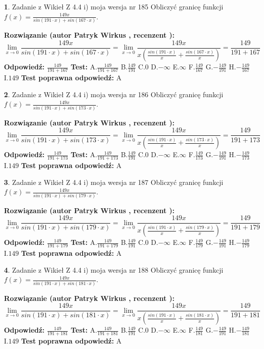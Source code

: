 \documentclass[12pt, a4paper]{article}
\theoremstyle{definition} %
\newtheorem{zad}{}
\newcommand{\zadStart}[1]{\begin{zad}#1\newline}
\newcommand{\zadStop}{\end{zad}}
\newcommand{\rozwStart}[2]{\noindent \textbf{Rozwiązanie (autor #1 , recenzent #2): }\newline}
\newcommand{\rozwStop}{\newline}
\newcommand{\odpStart}{\noindent \textbf{Odpowiedź:}\newline}
\newcommand{\odpStop}{\newline}
\newcommand{\testStart}{\noindent \textbf{Test:}\newline}
\newcommand{\testStop}{\newline}
\newcommand{\kluczStart}{\noindent \textbf{Test poprawna odpowiedź:}\newline}
\newcommand{\kluczStop}{\newline}
\begin{document}
\zadStart{Zadanie z Wikieł Z 4.4 i) moja wersja nr 185}
Obliczyć granicę funkcji $f(x)=\frac{149x}{sin(191\cdot x) +sin(167\cdot x)}$.
\zadStop
\rozwStart{Patryk Wirkus}{}
$$\lim\limits_{x\to 0}\frac{149x}{sin(191\cdot x) +sin(167\cdot x)}=\lim\limits_{x\to 0}\frac{149x}{x(\frac{sin(191\cdot x)}{x}+\frac{sin(167\cdot x)}{x})}=\frac{149}{191+167}$$
\rozwStop
\odpStart
$\frac{149}{191+167}$
\odpStop
\testStart
A.$\frac{149}{191+167}$
B.$\frac{149}{191}$
C.$0$
D.$-\infty$
E.$\infty$
F.$\frac{149}{167}$
G.$-\frac{149}{191}$
H.$-\frac{149}{167}$
I.$149$
\testStop
\kluczStart
A
\kluczStop



\zadStart{Zadanie z Wikieł Z 4.4 i) moja wersja nr 186}
Obliczyć granicę funkcji $f(x)=\frac{149x}{sin(191\cdot x) +sin(173\cdot x)}$.
\zadStop
\rozwStart{Patryk Wirkus}{}
$$\lim\limits_{x\to 0}\frac{149x}{sin(191\cdot x) +sin(173\cdot x)}=\lim\limits_{x\to 0}\frac{149x}{x(\frac{sin(191\cdot x)}{x}+\frac{sin(173\cdot x)}{x})}=\frac{149}{191+173}$$
\rozwStop
\odpStart
$\frac{149}{191+173}$
\odpStop
\testStart
A.$\frac{149}{191+173}$
B.$\frac{149}{191}$
C.$0$
D.$-\infty$
E.$\infty$
F.$\frac{149}{173}$
G.$-\frac{149}{191}$
H.$-\frac{149}{173}$
I.$149$
\testStop
\kluczStart
A
\kluczStop



\zadStart{Zadanie z Wikieł Z 4.4 i) moja wersja nr 187}
Obliczyć granicę funkcji $f(x)=\frac{149x}{sin(191\cdot x) +sin(179\cdot x)}$.
\zadStop
\rozwStart{Patryk Wirkus}{}
$$\lim\limits_{x\to 0}\frac{149x}{sin(191\cdot x) +sin(179\cdot x)}=\lim\limits_{x\to 0}\frac{149x}{x(\frac{sin(191\cdot x)}{x}+\frac{sin(179\cdot x)}{x})}=\frac{149}{191+179}$$
\rozwStop
\odpStart
$\frac{149}{191+179}$
\odpStop
\testStart
A.$\frac{149}{191+179}$
B.$\frac{149}{191}$
C.$0$
D.$-\infty$
E.$\infty$
F.$\frac{149}{179}$
G.$-\frac{149}{191}$
H.$-\frac{149}{179}$
I.$149$
\testStop
\kluczStart
A
\kluczStop



\zadStart{Zadanie z Wikieł Z 4.4 i) moja wersja nr 188}
Obliczyć granicę funkcji $f(x)=\frac{149x}{sin(191\cdot x) +sin(181\cdot x)}$.
\zadStop
\rozwStart{Patryk Wirkus}{}
$$\lim\limits_{x\to 0}\frac{149x}{sin(191\cdot x) +sin(181\cdot x)}=\lim\limits_{x\to 0}\frac{149x}{x(\frac{sin(191\cdot x)}{x}+\frac{sin(181\cdot x)}{x})}=\frac{149}{191+181}$$
\rozwStop
\odpStart
$\frac{149}{191+181}$
\odpStop
\testStart
A.$\frac{149}{191+181}$
B.$\frac{149}{191}$
C.$0$
D.$-\infty$
E.$\infty$
F.$\frac{149}{181}$
G.$-\frac{149}{191}$
H.$-\frac{149}{181}$
I.$149$
\testStop
\kluczStart
A
\kluczStop
\end{document}
